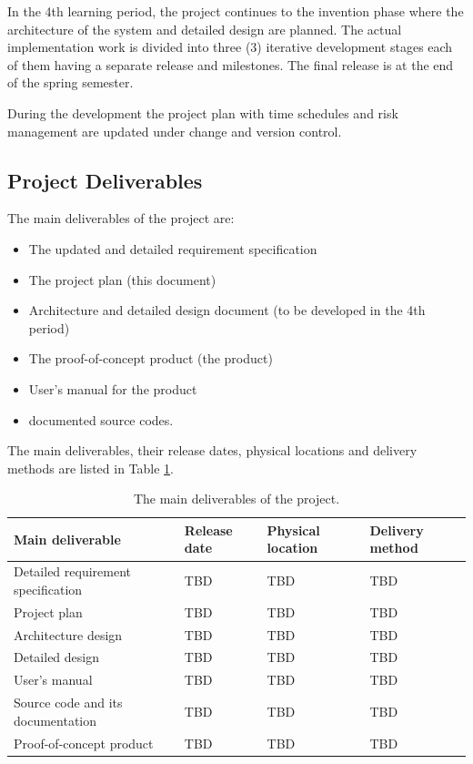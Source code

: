 \documentclass{article}
\begin{document}
In the 4th learning period, the project continues to the invention phase where the
architecture of the system and detailed design are planned. The actual
implementation work is divided into three (3) iterative development stages each
of them having a separate release and milestones. The final release is at the end
of the spring semester.

During the development the project plan with time schedules and risk
management are updated under change and version control.


\subsection{Project Deliverables}
The main deliverables of the project are:
\begin{itemize}
\item The updated and detailed requirement specification
\item The project plan (this document)
\item Architecture and detailed design document (to be developed in the 4th period)
\item The proof-of-concept product (the product)
\item User's manual for the product
\item documented source codes.
\end{itemize}


The main deliverables, their release dates, physical locations and delivery
methods are listed in Table \ref{tab:deliverable}.

\begin{table}[h]
\centering
\caption{The main deliverables of the project.}
\label{tab:deliverable}
\begin{tabular}{|l|l|l|l|}
\hline
\textbf{Main deliverable} & \textbf{Release date} & \textbf{Physical location} & \textbf{Delivery method} \\
\hline
Detailed requirement specification & TBD & TBD & TBD \\
\hline
Project plan & TBD & TBD & TBD \\
\hline
Architecture design & TBD & TBD & TBD \\
\hline
Detailed design & TBD & TBD & TBD \\
\hline
User’s manual & TBD & TBD & TBD \\
\hline
Source code and its documentation & TBD & TBD & TBD \\
\hline
Proof-of-concept product & TBD & TBD & TBD \\
\hline
\end{tabular}
\end{table}
\end{document}
